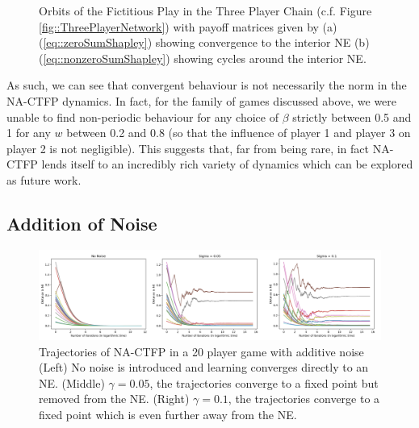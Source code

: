 \documentclass{article}
\theoremstyle{definition}
\begin{document}
\begin{figure}[t]
\begin{subfigure}[b]{0.45 \textwidth}
      \caption{\label{fig::nonconvergentShapley}}
    \end{subfigure}
    \caption{\label{fig::Shapley} Orbits of the Fictitious Play in the Three Player Chain (c.f.
    Figure \ref{fig::ThreePlayerNetwork}) with payoff matrices given by (a)
    (\ref{eq::zeroSumShapley}) showing convergence to the interior NE (b)
    (\ref{eq::nonzeroSumShapley}) showing cycles around the interior NE.}
  \end{figure}

  As such, we can see that convergent behaviour is not necessarily the norm in the NA-CTFP dynamics. In fact, for the family of games discussed above, we were unable to find non-periodic behaviour for any choice of $\beta$ strictly between 0.5 and 1 for any $w$ between 0.2 and 0.8 (so that the influence of player 1 and player 3 on player 2 is not negligible). This suggests that, far from being rare, in fact NA-CTFP lends itself to an incredibly rich variety of dynamics which can be explored as future work.
  

  \subsection{Addition of Noise}

  \begin{figure}[t]
    \centering
    \includegraphics[width = \columnwidth]{Figures/Noise20Player.png}
    \caption{\label{fig::Noise20Player} Trajectories of NA-CTFP in a 20 player game with additive noise (Left) No noise is introduced and learning converges directly to an NE. (Middle) $\gamma = 0.05$, the trajectories converge to a fixed point but removed from the NE. (Right) $\gamma = 0.1$, the trajectories converge to a fixed point which is even further away from the NE.}
  \end{figure}
\end{document}
